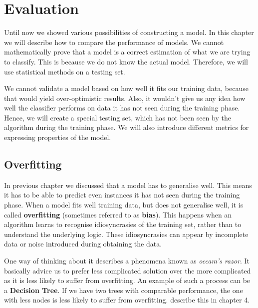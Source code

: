 \chapter{Evaluation}


\label{chap:eval}

Until now we showed various possibilities of constructing a model.
In this chapter we will describe how to compare the performance of models.
We cannot mathematically prove that a model is a correct estimation of what we are trying to classify.
This is because we do not know the actual model. 
Therefore, we will use statistical methods on a testing set.

We cannot validate a model based on how well it fits our training data, because that would yield over-optimistic results.
Also, it wouldn't give us any idea how well the classifier performs on data it has not seen during the training phase.
Hence, we will create a special testing set, which has not been seen by the algorithm during the training phase.
We will also introduce different metrics for expressing properties of the model. 

\section{Overfitting}

In  previous chapter  we discussed that a model has to generalise well. This means it has to be able to predict even
instances it has not seen during the training phase. When a model fits well training data, but does not generalise well, it is called
{\bf overfitting} (sometimes referred to as {\bf bias}).
This happens when an algorithm learns to recognise idiosyncrasies of the training set, rather than to understand the underlying logic.
These idiosyncrasies can appear by incomplete data or noise introduced during obtaining the data.

One way of thinking about it describes a phenomena  known as {\it occam's  razor}. 
It basically advice us to prefer  less complicated solution over the  more complicated  as it is less likely to suffer from overfitting.
An example of such a process can be a {\bf Decision Tree}.
If we have two trees with comparable performance, the one with less nodes is less likely to suffer from overfitting. \citet{TanBachKum08} describe this in chapter 4.

